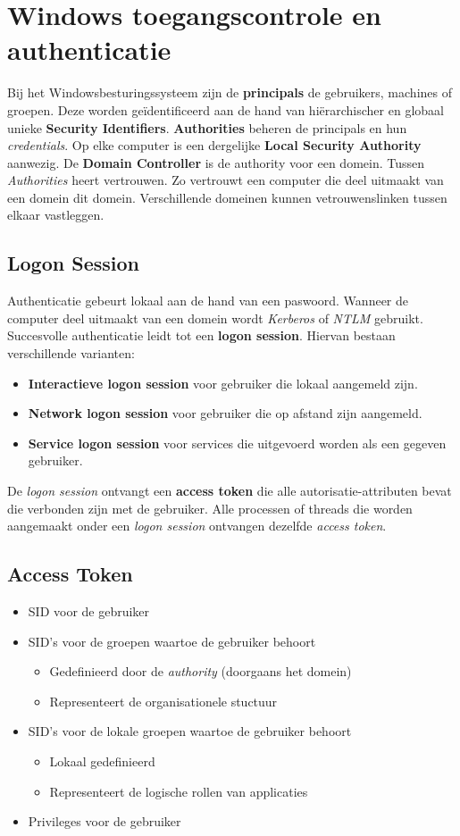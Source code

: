 \documentclass[../main.tex]{subfiles}
\begin{document}
\section{Windows toegangscontrole en authenticatie}
Bij het Windowsbesturingssysteem zijn de \textbf{principals} de gebruikers, machines of groepen. Deze worden ge\"identificeerd aan de hand van hi\"erarchischer en globaal unieke  \textbf{Security Identifiers}. \textbf{Authorities} beheren de principals en hun \textit{credentials}. Op elke computer is een dergelijke \textbf{Local Security Authority} aanwezig. De \textbf{Domain Controller} is de authority voor een domein. Tussen \textit{Authorities} heert vertrouwen. Zo vertrouwt een computer die deel uitmaakt van een domein dit domein. Verschillende domeinen kunnen vetrouwenslinken tussen elkaar vastleggen.
\subsection{Logon Session}
Authenticatie gebeurt lokaal aan de hand van een paswoord. Wanneer de computer deel uitmaakt van een domein wordt \textit{Kerberos} of \textit{NTLM} gebruikt. Succesvolle authenticatie leidt tot een \textbf{logon session}. Hiervan bestaan verschillende varianten:
\begin{itemize}
	\item \textbf{Interactieve logon session} voor gebruiker die lokaal aangemeld zijn.
	\item \textbf{Network logon session} voor gebruiker die op afstand zijn aangemeld.
	\item \textbf{Service logon session} voor services die uitgevoerd worden als een gegeven gebruiker.
\end{itemize}
De \textit{logon session} ontvangt een \textbf{access token} die alle autorisatie-attributen bevat die verbonden zijn met de gebruiker. Alle processen of threads die worden aangemaakt onder een \textit{logon session} ontvangen dezelfde \textit{access token}. 

\subsection{Access Token}
\begin{itemize}
	\item SID voor de gebruiker
	\item SID's voor de groepen waartoe de gebruiker behoort
	\begin{itemize}
		\item Gedefinieerd door de \textit{authority} (doorgaans het domein)
		\item Representeert de organisationele stuctuur
	\end{itemize}
	\item SID's voor de lokale groepen waartoe de gebruiker behoort
	\begin{itemize}
		\item Lokaal gedefinieerd
		\item Representeert de logische rollen van applicaties
	\end{itemize}
	\item Privileges voor de gebruiker
\end{itemize}
\end{document}

